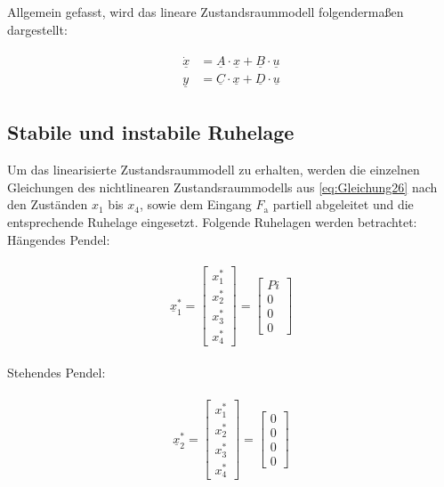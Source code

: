  Allgemein gefasst, wird das lineare Zustandsraummodell folgendermaßen dargestellt:

\begin{align}\label{eq:Gleichung29}
    \begin{split}
        \dot{\underline{x}} &= \underline{A}\cdot\underline{x}+\underline{B}\cdot\underline{u}\\
        \underline{y} &= \underline{C}\cdot\underline{x}+\underline{D}\cdot\underline{u}
    \end{split}
\end{align}

\subsection{Stabile und instabile Ruhelage}
Um das linearisierte Zustandsraummodell zu erhalten, werden die einzelnen Gleichungen des nichtlinearen Zustandsraummodells aus \autoref{eq:Gleichung26} nach den Zuständen $x_{\mathrm{1}}$ bis $x_{\mathrm{4}}$, sowie dem Eingang $F_{\mathrm{a}}$ partiell abgeleitet und die entsprechende Ruhelage eingesetzt. Folgende Ruhelagen werden betrachtet:\\
Hängendes Pendel:

\begin{align}\label{eq:Gleichung30}
    \begin{split}
        \underline{x}_{\mathrm{1}}^{*}=
        \begin{bmatrix}
            x_{\mathrm{1}}^{*}\\
            x_{\mathrm{2}}^{*}\\
            x_{\mathrm{3}}^{*}\\
            x_{\mathrm{4}}^{*}
        \end{bmatrix}=
        \begin{bmatrix}
            Pi\\
            0\\
            0\\
            0
        \end{bmatrix}
    \end{split}
\end{align}

Stehendes Pendel:

\begin{align}\label{eq:Gleichung31}
    \begin{split}
        \underline{x}_{\mathrm{2}}^{*}=
        \begin{bmatrix}
            x_{\mathrm{1}}^{*}\\
            x_{\mathrm{2}}^{*}\\
            x_{\mathrm{3}}^{*}\\
            x_{\mathrm{4}}^{*}
        \end{bmatrix}=
        \begin{bmatrix}
            0\\
            0\\
            0\\
            0
        \end{bmatrix}
    \end{split}
\end{align}

